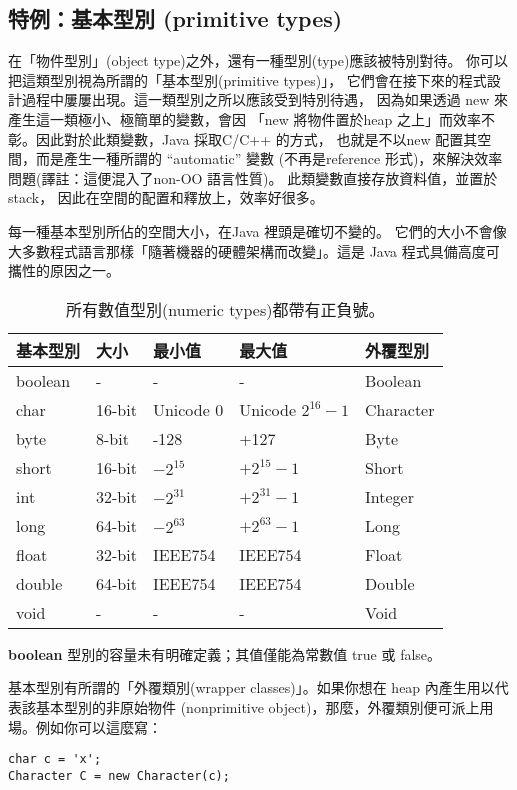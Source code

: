 \subsection{特例：基本型別 (primitive types)}
在「物件型別」(object type)之外，還有一種型別(type)應該被特別對待。
你可以把這類型別視為所謂的「基本型別(primitive types)」，
它們會在接下來的程式設計過程中屢屢出現。這一類型別之所以應該受到特別待遇，
因為如果透過 new 來產生這一類極小、極簡單的變數，會因
「new 將物件置於heap 之上」而效率不彰。因此對於此類變數，Java 採取C/C++ 的方式，
也就是不以new 配置其空間，而是產生一種所謂的 ``automatic'' 變數
(不再是reference 形式)，來解決效率問題(譯註：這便混入了non-OO 語言性質)。
此類變數直接存放資料值，並置於stack， 因此在空間的配置和釋放上，效率好很多。

每一種基本型別所佔的空間大小，在Java 裡頭是確切不變的。
它們的大小不會像大多數程式語言那樣「隨著機器的硬體架構而改變」。這是
Java 程式具備高度可攜性的原因之一。

\bigskip
\begin{table}[htbp]
\center
\begin{tabular}{lllll}
\toprule
基本型別 & 大小 & 最小值 & 最大值 & 外覆型別\\
\midrule
boolean & - & - & - & Boolean\\
\midrule
char & 16-bit & Unicode 0 & Unicode $2^{16}-1$ & Character \\
\midrule
byte & 8-bit & -128 & +127 & Byte \\
\midrule
short & 16-bit & $-2^{15}$ & $+2^{15}-1$ & Short \\
\midrule
int & 32-bit & $-2^{31}$ & $+2^{31}-1$ & Integer \\
\midrule
long & 64-bit & $-2^{63}$ & $+2^{63}-1$ & Long \\
\midrule
float & 32-bit & IEEE754 & IEEE754 & Float \\
\midrule
double & 64-bit & IEEE754 & IEEE754 & Double\\
\midrule
void & - & - & - & Void\\
\bottomrule
\end{tabular}
\caption{所有數值型別(numeric types)都帶有正負號。}
\end{table}

\textbf{boolean}
型別的容量未有明確定義；其值僅能為常數值 true 或 false。

基本型別有所謂的「外覆類別(wrapper classes)」。如果你想在
heap 內產生用以代表該基本型別的非原始物件
(nonprimitive object)，那麼，外覆類別便可派上用場。例如你可以這麼寫：
\begin{Verbatim}[frame=single]
char c = 'x';
Character C = new Character(c);
\end{Verbatim}

